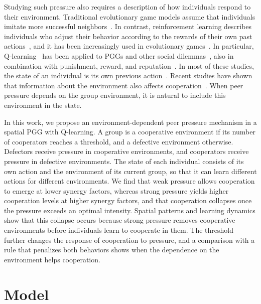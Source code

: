 \documentclass[%
  aip,cha,
  amsmath,amssymb,
  reprint,
  floatfix,
  article-title,
]{revtex4-2}
\begin{document}
Studying such pressure also requires a description of how individuals respond to their environment.
Traditional evolutionary game models assume that individuals imitate more successful neighbors~\cite{szabo2007evolutionary,traulsen2010human}.
In contrast, reinforcement learning describes individuals who adjust their behavior according to the rewards of their own past actions~\cite{young2009learning,sutton2018reinforcement}, and it has been increasingly used in evolutionary games~\cite{xie2026reinforcement,zheng2026brief}.
In particular, Q-learning~\cite{watkins1992qlearning} has been applied to PGGs and other social dilemmas~\cite{zheng2024evolution,shi2024model,wang2025spatial,mintz2025evolutionary,li2025cooperation}, also in combination with punishment, reward, and reputation~\cite{zhao2024emergence,wang2023synergistic,ren2024interaction,shen2024adaptive,li2026reputation}.
In most of these studies, the state of an individual is its own previous action~\cite{wang2022levy,fan2022incorporating,du2026shaping}.
Recent studies have shown that information about the environment also affects cooperation~\cite{kleshnina2023effect,lv2025reinforcement,li2025environmental}.
When peer pressure depends on the group environment, it is natural to include this environment in the state.

In this work, we propose an environment-dependent peer pressure mechanism in a spatial PGG with Q-learning.
A group is a cooperative environment if its number of cooperators reaches a threshold, and a defective environment otherwise.
Defectors receive pressure in cooperative environments, and cooperators receive pressure in defective environments.
The state of each individual consists of its own action and the environment of its current group, so that it can learn different actions for different environments.
We find that weak pressure allows cooperation to emerge at lower synergy factors, whereas strong pressure yields higher cooperation levels at higher synergy factors, and that cooperation collapses once the pressure exceeds an optimal intensity.
Spatial patterns and learning dynamics show that this collapse occurs because strong pressure removes cooperative environments before individuals learn to cooperate in them.
The threshold further changes the response of cooperation to pressure, and a comparison with a rule that penalizes both behaviors shows when the dependence on the environment helps cooperation.


\section{Model}\label{sec:model}
\end{document}
